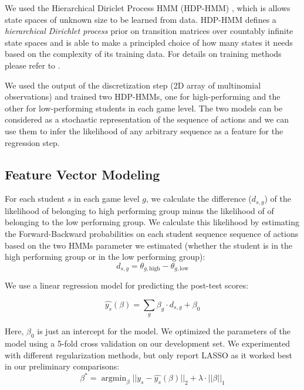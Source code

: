 \documentclass{sigchi}
\DeclareMathOperator*{\argmin}{argmin}
\begin{document}
We used the Hierarchical Diriclet Process HMM (HDP-HMM) \cite{fox2008hdp}, which is allows state spaces of unknown size to be learned from data. 
HDP-HMM defines a \textit{hierarchical Dirichlet process} prior on transition matrices over countably infinite state spaces and is able to make a principled choice of how many states it needs based on the complexity of its training data. 
For details on training methods please refer to \cite{fox2008hdp}.

We used the output of the discretization step (2D array of multinomial observations) and trained two HDP-HMMs, one for high-performing and the other for low-performing students in each game level. The two models can be considered as a stochastic representation of the sequence of actions and we can use them to infer the likelihood of any arbitrary sequence as a feature for the regression step. 

\subsection{Feature Vector Modeling}

For each student $s$  in each game level $g$, we calculate the difference ($d_{s,g}$) of the likelihood of belonging to high performing group minus the likelihood of of belonging to the low performing group.
We calculate this likelihood by estimating the Forward-Backward probabilities  on each student sequence sequence of actions  based on the two HMMs parameter we estimated (whether the student is in the high performing group or in the low performing group):
\begin{equation}
d_{s,g} = \theta_{g, \text{high}} - \theta_{g, \text{low}}
\end{equation}

We use  a linear regression model for predicting the post-test scores:

\begin{equation}
\hat {y_s}(\beta) =   \sum_g \beta_g \cdot d_{s,g}  + \beta_0
\end{equation}

Here, $\beta_0$ is just an intercept for the  model.  
We optimized the parameters of the model using a 5-fold cross validation on our development set.
We experimented with different regularization methods, but only report LASSO \cite{tibshirani1996regression} as it worked best in our preliminary comparisons:
\begin{equation}
\beta^* = \argmin_\beta || y_s - \hat{y_s}(\beta)  ||_2 + \lambda \cdot || \beta ||_1
\end{equation}
\end{document}
